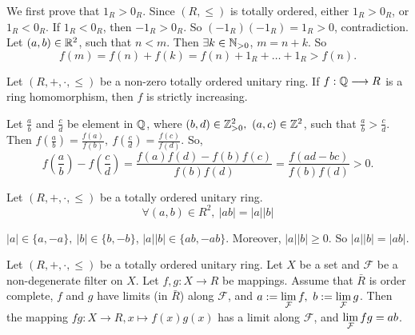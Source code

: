 \begin{proofenv}
    We first prove that $1_R>0_R$. Since $(R,\le )$ is totally ordered, either $1_R>0_R$, or $1_R<0_R$. If $1_R<0_R$, then $-1_R>0_R$. So $(-1_R)(-1_R)=1_R>0$, contradiction. Let $(a,b)\in \mathbb{R}^2$, such that $n<m$. Then $\exists k\in \mathbb{N}_{>0}$, $m=n+k$. So 
    $$f(m)=f(n)+f(k)=f(n)+1_R+\dots+1_R>f(n).$$
\end{proofenv}
\begin{propositionenv}
    Let $(R,+,\cdot,\le)$ be a non-zero totally ordered unitary ring. If $f:\mathbb{Q}\longrightarrow R$ is a ring homomorphism, then $f$ is strictly increasing.
\end{propositionenv}
\begin{proofenv}
    Let $\frac{a}{b}$ and $\frac{c}{d}$ be element in $\mathbb{Q}$, where $(b,d)\in \mathbb{Z}_{>0}^2,\  (a,c)\in \mathbb{Z}^2$, such that $\frac{a}{b}>\frac{c}{d}$. Then $f\left(\frac{a}{b}\right)=\frac{f(a)}{f(b)},\ f\left(\frac{c}{d}\right)=\frac{f(c)}{f(d)}$. So,
    $$f\left(\frac{a}{b}\right)-f\left(\frac{c}{d}\right)=\frac{f(a)f(d)-f(b)f(c)}{f(b)f(d)}=\frac{f(ad-bc)}{f(b)f(d)}>0.$$
\end{proofenv}
\begin{propositionenv}
    Let $(R,+,\cdot,\le)$ be a totally ordered unitary ring. 
    $$\forall (a,b)\in R^2,\ \left|ab\right|=\left|a\right|\left| b\right|$$
\end{propositionenv}
\begin{proofenv}
    $|a|\in \{a,-a\},\ |b|\in \{b,-b\}$, $|a||b|\in\{ab,-ab\}$. Moreover, $|a||b|\ge 0$. So $|a||b| = |ab|$.
\end{proofenv}
\begin{theoremenv}
    Let $(R,+,\cdot,\le)$ be a totally ordered unitary ring. 
    Let $X$ be a set and $\mathcal{F}$ be a non-degenerate filter on $X$. Let $f,g:X\longrightarrow R$ be mappings. Assume that $\bar{R}$ is order complete, $f$ and $g$ have limits (in $\bar{R}$) along $\mathcal{F}$, and $\dis a:=\lim_{\mathcal{F}}f,\ b:=\lim_{\mathcal{F}}g$. Then the mapping $fg: X\longrightarrow R, x\longmapsto f(x)g(x)$ has a limit along $\mathcal{F}$, and $\displaystyle \lim_{\mathcal{F}}fg=ab$.
\end{theoremenv}
